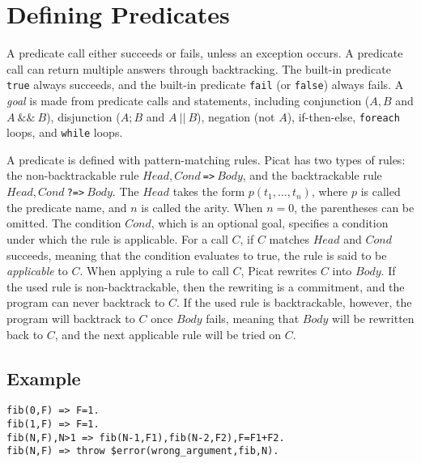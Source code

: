 \section{Defining Predicates}
A predicate call either succeeds or fails, unless an exception occurs. A predicate call can return multiple answers through backtracking. The built-in predicate \texttt{true} always succeeds, and the built-in predicate \texttt{fail} (or \texttt{false}) always fails. A \emph{goal} is made from predicate calls and statements, including conjunction ($A,B$ and $A\ \&\&\ B$), disjunction ($A;B$ and $A\ ||\ B$), negation (not $A$), if-then-else, \texttt{foreach} loops, and \texttt{while} loops.

A predicate is defined with pattern-matching rules. Picat has two types of rules: the non-backtrackable rule $Head, Cond\ $\verb+=>+$\ Body$, and the backtrackable rule $Head, Cond\ $\verb+?=>+$\ Body$. The $Head$ takes the form $p(t_1,\ldots,t_n)$, where $p$ is called the predicate name, and $n$ is called the arity. When $n=0$, the parentheses can be omitted. The condition $Cond$, which is an optional goal, specifies a condition under which the rule is applicable. For a call $C$, if $C$ matches $Head$ and $Cond$ succeeds, meaning that the condition evaluates to true, the rule is said to be \emph{applicable} to $C$. When applying a rule to call $C$, Picat rewrites $C$ into $Body$. If the used rule is non-backtrackable, then the rewriting is a commitment, and the program can never backtrack to $C$. If the used rule is backtrackable, however, the program will backtrack to $C$ once $Body$ fails, meaning that $Body$ will be rewritten back to $C$, and the next applicable rule will be tried on $C$. 

\subsection*{Example}
\begin{verbatim}
fib(0,F) => F=1.
fib(1,F) => F=1.
fib(N,F),N>1 => fib(N-1,F1),fib(N-2,F2),F=F1+F2.
fib(N,F) => throw $error(wrong_argument,fib,N).
\end{verbatim}

